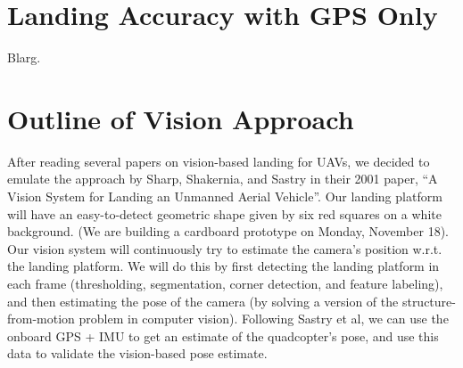 \documentclass[10pt, twocolumn]{scrartcl} %
\begin{document}
\section{Landing Accuracy with GPS Only}

Blarg.

\section{Outline of Vision Approach}

After reading several papers on vision-based landing for UAVs, we decided to
emulate the approach by Sharp, Shakernia, and Sastry in their 2001 paper, ``A
Vision System for Landing an Unmanned Aerial Vehicle''. Our landing platform
will have an easy-to-detect geometric shape given by six red squares on a white
background. (We are building a cardboard prototype on Monday, November 18). Our
vision system will continuously try to estimate the camera's position w.r.t.
the landing platform. We will do this by first detecting the landing platform
in each frame (thresholding, segmentation, corner detection, and feature
labeling), and then estimating the pose of the camera (by solving a version of
the structure-from-motion problem in computer vision). Following Sastry et al,
we can use the onboard GPS + IMU to get an estimate of the quadcopter's pose,
and use this data to validate the vision-based pose estimate.
\end{document}
